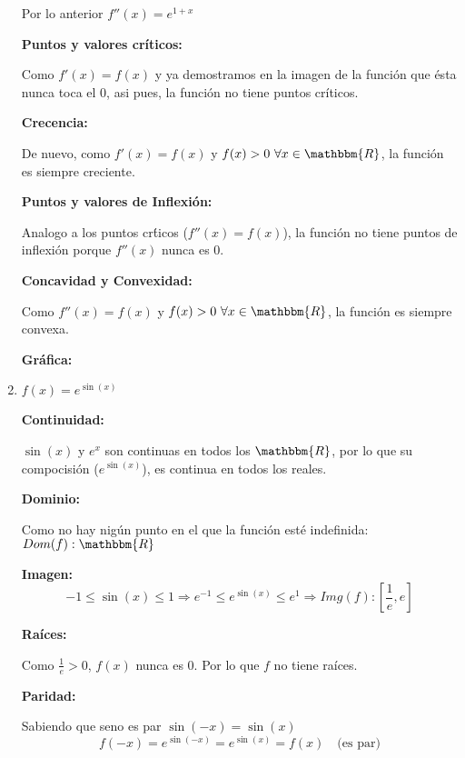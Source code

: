 \documentclass[12pt]{article}
\begin{document}
\begin{enumerate}[\hspace{9px} a)]
            Por lo anterior \(f''(x) = e^{1+x}\)\medskip

        \textbf{Puntos y valores cr\'iticos: }\medskip

            Como \(f'(x)=f(x)\) y ya demostramos en la imagen de la funci\'on que \'esta nunca toca el 0, asi pues, la funci\'on no tiene puntos cr\'iticos.\medskip

        \textbf{Crecencia: }\medskip

            De nuevo, como \(f'(x)=f(x)\) y \(f(x)>0 \ \forall x\in\mathbbm{R}\), la funci\'on es siempre creciente.\medskip

        \textbf{Puntos y valores de Inflexi\'on: }\medskip

            Analogo a los puntos cr\'ticos (\(f''(x)=f(x)\)), la funci\'on no tiene puntos de inflexi\'on porque \(f''(x)\) nunca es 0.\medskip

        \textbf{Concavidad y Convexidad: }\medskip

            Como \(f''(x)=f(x)\) y \(f(x)>0 \ \forall x\in\mathbbm{R}\), la funci\'on es siempre convexa.\medskip

        \textbf{Gr\'afica: }

    \item \(f(x)=e^{\sin(x)}\)\medskip
    
        \textbf{Continuidad: }\medskip

            \(\sin(x)\) y \(e^x\) son continuas en todos los \(\mathbbm{R}\), por lo que su compocisi\'on (\(e^{\sin(x)}\)), es continua en todos los reales.\medskip

        \textbf{Dominio: }\medskip

            Como no hay nig\'un punto en el que la funci\'on est\'e indefinida: \(Dom(f): \mathbbm{R}\)\medskip

        \textbf{Imagen: }
            \begin{equation*}
                -1\leq\sin(x)\leq1 \Longrightarrow e^{-1}\leq e^{\sin(x)}\leq e^1 \Longrightarrow Img(f):\left[\frac{1}{e},e\right]
            \end{equation*}

        \textbf{Ra\'ices: }\medskip

            Como \(\frac{1}{e}>0\), $f(x)$ nunca es 0. Por lo que \(f\) no tiene ra\'ices.\medskip

        \textbf{Paridad: }\medskip

            Sabiendo que seno es par \(\sin(-x)=\sin(x)\)
            \begin{equation*}
                f(-x) = e^{\sin(-x)} = e^{\sin(x)} = f(x) \quad \text{(es par)}
            \end{equation*}


\end{enumerate}
\end{document}
